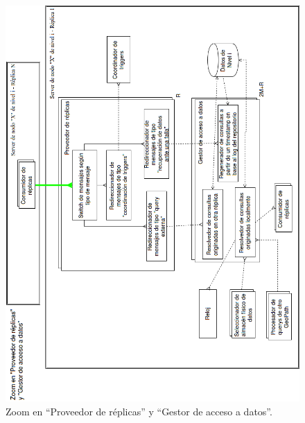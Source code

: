 \begin{figure}[H]
   \centering
   \includegraphics[height=0.93\textheight]{reentrega/imagenes/admDatos-zoom1.png}
   \caption{Zoom en ``Proveedor de réplicas'' y ``Gestor de acceso a datos''.}
\end{figure}


